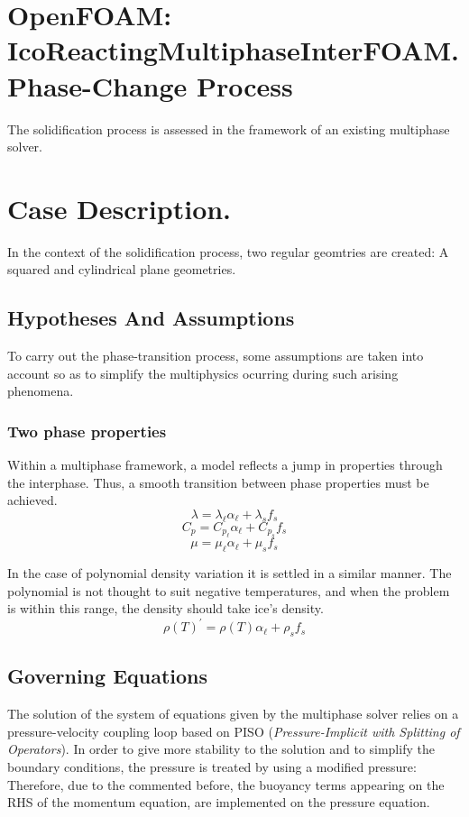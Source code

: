 \clearpage
\section{OpenFOAM: IcoReactingMultiphaseInterFOAM. Phase-Change Process}
The solidification process is assessed in the framework of an existing multiphase solver. 
\section{Case Description.}
In the context of the solidification process, two regular geomtries are created: A squared and cylindrical plane geometries. 

\subsection{Hypotheses And Assumptions}
To carry out the phase-transition process, some assumptions are taken into account so as to simplify the multiphysics ocurring during such arising phenomena. 
\subsubsection*{Two phase properties}
Within a multiphase framework, a model reflects a jump in properties through the interphase. Thus, a smooth transition between phase properties must be achieved.
\begin{equation}
\lambda=\lambda_{\ell} \alpha_{\ell}+\lambda_{s} f_{s}
\label{3.34}
\end{equation}
\begin{equation}
C_{p}=C_{p_{\ell}} \alpha_{\ell}+C_{p_{s}} f_{s}
\label{3.35}
\end{equation}
\begin{equation}
\mu=\mu_{\ell} \alpha_{\ell}+\mu_{s} f_{s}
\label{3.36}
\end{equation}

In the case of polynomial density variation it is settled in a similar manner. The polynomial is not thought to suit negative temperatures, and when the problem is within this range, the density should take ice's density.
\begin{equation}
\rho(T)^{\prime}=\rho(T) \alpha_{\ell}+\rho_{s} f_{s}
\label{3.37}
\end{equation}

\subsection{Governing Equations}
The solution of the system of equations given by the multiphase solver relies on a pressure-velocity coupling loop based on PISO (\textit{Pressure-Implicit with Splitting of Operators}). In order to give more stability to the solution and to simplify the boundary conditions, the pressure is treated by using a modified pressure:
\newline
Therefore, due to the commented before, the buoyancy terms appearing on the RHS of the momentum equation, are implemented on the pressure equation.

